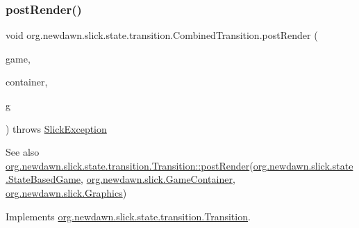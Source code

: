 \subsubsection{\texorpdfstring{post\+Render()}{postRender()}}
{\footnotesize\ttfamily void org.\+newdawn.\+slick.\+state.\+transition.\+Combined\+Transition.\+post\+Render (\begin{DoxyParamCaption}\item[{\mbox{\hyperlink{classorg_1_1newdawn_1_1slick_1_1state_1_1_state_based_game}{State\+Based\+Game}}}]{game,  }\item[{\mbox{\hyperlink{classorg_1_1newdawn_1_1slick_1_1_game_container}{Game\+Container}}}]{container,  }\item[{\mbox{\hyperlink{classorg_1_1newdawn_1_1slick_1_1_graphics}{Graphics}}}]{g }\end{DoxyParamCaption}) throws \mbox{\hyperlink{classorg_1_1newdawn_1_1slick_1_1_slick_exception}{Slick\+Exception}}\hspace{0.3cm}{\ttfamily [inline]}}

\begin{DoxySeeAlso}{See also}
\mbox{\hyperlink{interfaceorg_1_1newdawn_1_1slick_1_1state_1_1transition_1_1_transition_ac113f4d5a19962a62a8adec7f9ab5d47}{org.\+newdawn.\+slick.\+state.\+transition.\+Transition\+::post\+Render}}(\mbox{\hyperlink{classorg_1_1newdawn_1_1slick_1_1state_1_1_state_based_game}{org.\+newdawn.\+slick.\+state.\+State\+Based\+Game}}, \mbox{\hyperlink{classorg_1_1newdawn_1_1slick_1_1_game_container}{org.\+newdawn.\+slick.\+Game\+Container}}, \mbox{\hyperlink{classorg_1_1newdawn_1_1slick_1_1_graphics}{org.\+newdawn.\+slick.\+Graphics}}) 
\end{DoxySeeAlso}


Implements \mbox{\hyperlink{interfaceorg_1_1newdawn_1_1slick_1_1state_1_1transition_1_1_transition_ac113f4d5a19962a62a8adec7f9ab5d47}{org.\+newdawn.\+slick.\+state.\+transition.\+Transition}}.


